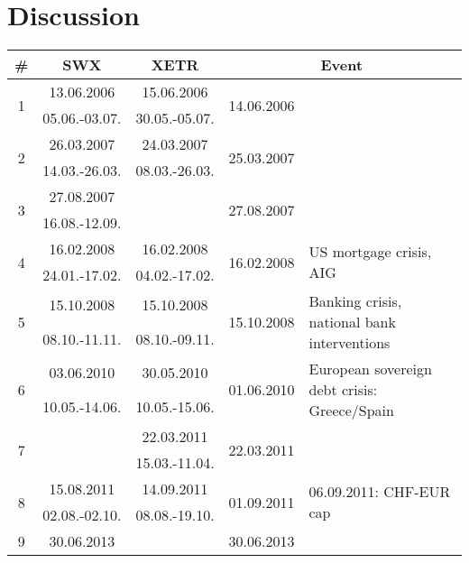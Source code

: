 \documentclass[11pt,twoside,a4paper]{article}
\numberwithin{equation}{section}
\begin{document}
\section{Discussion}
\begin{table}
\begin{tabular}{c|c|c|c|l}
\# & SWX & XETR & \multicolumn{2}{|c}{Event}\\
\hline
\multirow{2}{*}{1} & 13.06.2006 		& 15.06.2006     & \multirow{2}{*}{14.06.2006} & \multirow{2}{0.33\linewidth}{}\\
							 & 05.06.-03.07.	& 30.05.-05.07. & &\\
\hline
\multirow{2}{*}{2} & 26.03.2007 		& 24.03.2007     & \multirow{2}{*}{25.03.2007} & \multirow{2}{0.33\linewidth}{}\\
							 & 14.03.-26.03.	& 08.03.-26.03. & &\\
\hline
\multirow{2}{*}{3} & 27.08.2007 		&      & \multirow{2}{*}{27.08.2007} & \multirow{2}{0.33\linewidth}{}\\
							 & 16.08.-12.09.	& & &\\
\hline
\multirow{2}{*}{4} & 16.02.2008 		& 16.02.2008     & \multirow{2}{*}{16.02.2008} & \multirow{2}{0.33\linewidth}{US mortgage crisis, AIG}\\
							 & 24.01.-17.02.	& 04.02.-17.02. & &\\
\hline
\multirow{2}{*}{5} & 15.10.2008 		& 15.10.2008     & \multirow{2}{*}{15.10.2008} & \multirow{2}{0.33\linewidth}{Banking crisis, national bank interventions}\\
							 & 08.10.-11.11.	& 08.10.-09.11. & &\\
\hline
\multirow{2}{*}{6} & 03.06.2010 		& 30.05.2010     & \multirow{2}{*}{01.06.2010} & \multirow{2}{0.33\linewidth}{European sovereign debt crisis: Greece/Spain}\\
							 & 10.05.-14.06.	& 10.05.-15.06. & &\\
\hline
\multirow{2}{*}{7} & & 22.03.2011     & \multirow{2}{*}{22.03.2011} & \multirow{2}{0.33\linewidth}{}\\
							 & & 15.03.-11.04. & &\\
\hline
\multirow{2}{*}{8} & 15.08.2011 		& 14.09.2011  & \multirow{2}{*}{01.09.2011} & \multirow{2}{0.33\linewidth}{06.09.2011:  CHF-EUR cap}\\
							 & 02.08.-02.10.	& 08.08.-19.10. & &\\
\hline
\multirow{2}{*}{9} & 30.06.2013 		& & \multirow{2}{*}{30.06.2013} & \multirow{2}{0.33\linewidth}{}\\

\end{tabular}
\end{table}
\end{document}
